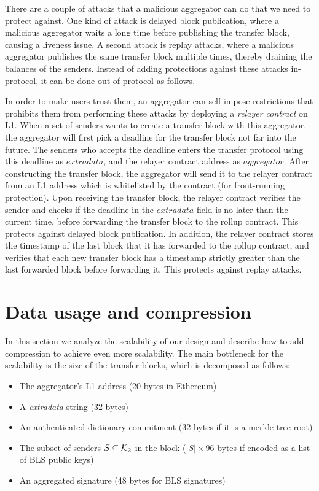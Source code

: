 There are a couple of attacks that a malicious aggregator can do that we need to protect against. One kind of attack is delayed block publication, where a malicious aggregator waits a long time before publishing the transfer block, causing a liveness issue. A second attack is replay attacks, where a malicious aggregator publishes the same transfer block multiple times, thereby draining the balances of the senders. Instead of adding protections against these attacks in-protocol, it can be done out-of-protocol as follows.

In order to make users trust them, an aggregator can self-impose restrictions that prohibits them from performing these attacks by deploying a \emph{relayer contract} on L1. When a set of senders wants to create a transfer block with this aggregator, the aggregator will first pick a deadline for the transfer block not far into the future. The senders who accepts the deadline enters the transfer protocol using this deadline as \(extradata\), and the relayer contract address as \(aggregator\). After constructing the transfer block, the aggregator will send it to the relayer contract from an L1 address which is whitelisted by the contract (for front-running protection). Upon receiving the transfer block, the relayer contract verifies the sender and checks if the deadline in the \(extradata\) field is no later than the current time, before forwarding the transfer block to the rollup contract. This protects against delayed block publication. In addition, the relayer contract stores the timestamp of the last block that it has forwarded to the rollup contract, and verifies that each new transfer block has a timestamp strictly greater than the last forwarded block before forwarding it. This protects against replay attacks.

\section{Data usage and compression}

In this section we analyze the scalability of our design and describe how to add compression to achieve even more scalability. The main bottleneck for the scalability is the size of the transfer blocks, which is decomposed as follows:

\begin{itemize}
  \item The aggregator's L1 address (20 bytes in Ethereum)
  \item A \emph{extradata} string (32 bytes)
  \item An authenticated dictionary commitment (32 bytes if it is a merkle tree root)
  \item The subset of senders \(S \subseteq \mathcal{K}_2\) in the block (\(|S| \times 96\) bytes if encoded as a list of BLS public keys)
  \item An aggregated signature (48 bytes for BLS signatures)
\end{itemize}

